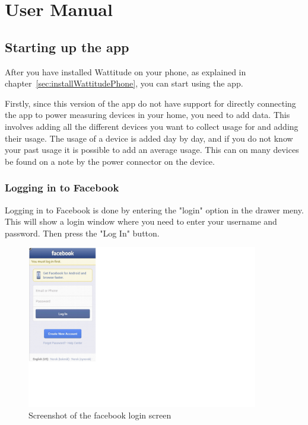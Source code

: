 \chapter{User Manual}

\section{Starting up the app}
After you have installed Wattitude on your phone, as explained in chapter~\ref{sec:installWattitudePhone}, you can start using the app. 

Firstly, since this version of the app do not have support for directly connecting the app to power measuring devices in your home, you need to add data. This involves adding all the different devices you want to collect usage for and adding their usage. The usage of a device is added day by day, and if you do not know your past usage it is possible to add an average usage. This can on many devices be found on a note by the power connector on the device.

\subsection{Logging in to Facebook}
Logging in to Facebook is done by entering the "login" option in the drawer meny. This will show a login window where you need to enter your username and password. Then press the "Log In" button. 

\begin{figure}[H]
\centering
\includegraphics[width=0.9\textwidth]{appendix/usermanual/fig/Facebooklogin.png}
\caption{Screenshot of the facebook login screen}
\end{figure}


